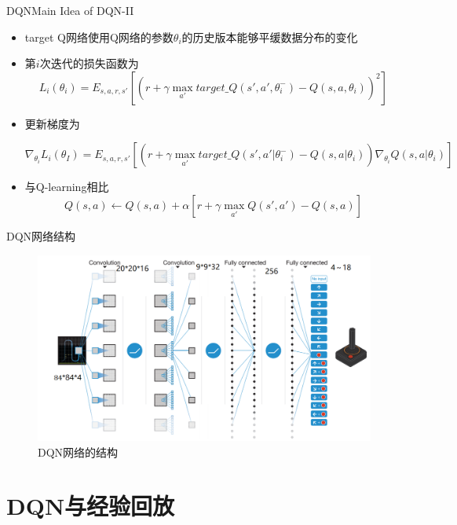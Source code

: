 \documentclass[10pt]{beamer}
\begin{document}
	\begin{frame}{DQN}{Main Idea of DQN-II}
		\begin{itemize}
			\item<2-> target Q网络使用Q网络的参数$\theta_i$的历史版本能够平缓数据分布的变化
			
			\item<3-> 第$i$次迭代的损失函数为
			\[L_i(\theta_i)=E_{s,a,r,s'}[(r + \gamma \max_{a'}target\_Q(s',a',\theta_i^-) - Q(s,a,\theta_i))^2] \]
			
			\item<4-> 更新梯度为
				\begin{small}
					\[\nabla_{\theta_i}L_i(\theta_I) = E_{s,a,r,s'}[(r + \gamma \max_{a'} target\_Q(s',a'|\theta_i^-) - Q(s,a|\theta_i))\nabla_{\theta_i}Q(s,a|\theta_i)] \]
				\end{small}
			
			\item<5-> 与Q-learning相比
			\[ Q(s, a) \gets Q(s, a) + \alpha \left[r + \gamma \max_{a'}Q(s', a') - Q(s, a) \right] \]
			
		\end{itemize}
	\end{frame}

	\begin{frame}{DQN}{网络结构}
		\begin{figure}
			\centering
			\includegraphics[width=0.9\linewidth]{pictures/dqn-architecture}
			\caption{DQN网络的结构}
			\label{fig:dqn-architecture}
		\end{figure}
		
	\end{frame}

	\section{DQN与经验回放}
\end{document}
